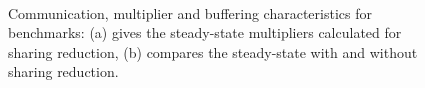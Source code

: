 \begin{figure}[t]
\centering
{} \\
\caption[Communication, multiplier and buffering statistics for
benchmarks.]{
Communication, multiplier and buffering characteristics for
benchmarks: (a) gives the steady-state multipliers calculated for
sharing reduction, (b) compares the steady-state with and without
sharing reduction. 
\label{fig:fission-table}}
\end{figure}

